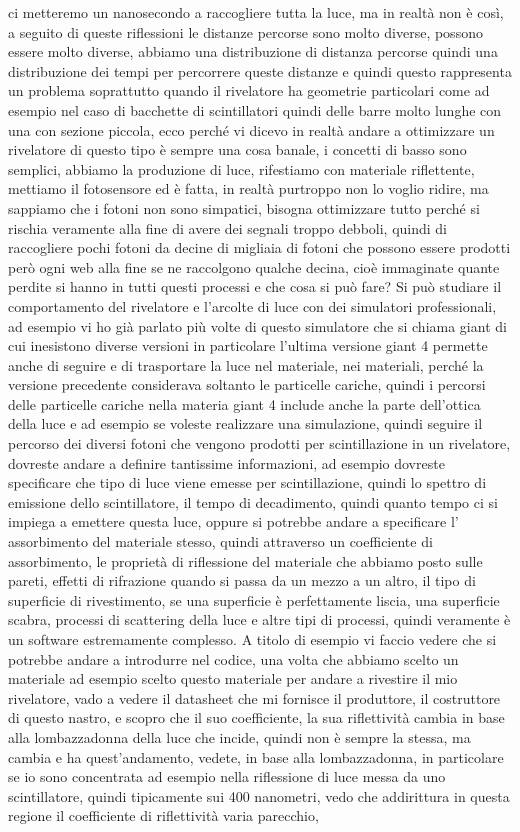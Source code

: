 {ci metteremo un nanosecondo a raccogliere tutta la luce, ma in realtà non è così, a seguito di queste riflessioni le distanze percorse sono molto diverse, possono essere molto diverse, abbiamo una distribuzione di distanza percorse quindi una distribuzione dei tempi per percorrere queste distanze e quindi questo rappresenta un problema soprattutto quando il rivelatore ha geometrie particolari come ad esempio nel caso di bacchette di scintillatori quindi delle barre molto lunghe con una con sezione piccola, ecco perché vi dicevo in realtà andare a ottimizzare un rivelatore di questo tipo è sempre una cosa banale, i concetti di basso sono semplici, abbiamo la produzione di luce, rifestiamo con materiale riflettente, mettiamo il fotosensore ed è fatta, in realtà purtroppo non lo voglio ridire, ma sappiamo che i fotoni non sono simpatici, bisogna ottimizzare tutto perché si rischia veramente alla fine di avere dei segnali troppo debboli, quindi di raccogliere pochi fotoni da decine di migliaia di fotoni che possono essere prodotti però ogni web alla fine se ne raccolgono qualche decina, cioè immaginate quante perdite si hanno in tutti questi processi e che cosa si può fare? Si può studiare il comportamento del rivelatore e l'arcolte di luce con dei simulatori professionali, ad esempio vi ho già parlato più volte di questo simulatore che si chiama giant di cui inesistono diverse versioni in particolare l'ultima versione giant 4 permette anche di seguire e di trasportare la luce nel materiale, nei materiali, perché la versione precedente considerava soltanto le particelle cariche, quindi i percorsi delle particelle cariche nella materia giant 4 include anche la parte dell'ottica della luce e ad esempio se voleste realizzare una simulazione, quindi seguire il percorso dei diversi fotoni che vengono prodotti per scintillazione in un rivelatore, dovreste andare a definire tantissime informazioni, ad esempio dovreste specificare che tipo di luce viene emesse per scintillazione, quindi lo spettro di emissione dello scintillatore, il tempo di decadimento, quindi quanto tempo ci si impiega a emettere questa luce, oppure si potrebbe andare a specificare l' assorbimento del materiale stesso, quindi attraverso un coefficiente di assorbimento, le proprietà di riflessione del materiale che abbiamo posto sulle pareti, effetti di rifrazione quando si passa da un mezzo a un altro, il tipo di superficie di rivestimento, se una superficie è perfettamente liscia, una superficie scabra, processi di scattering della luce e altre tipi di processi, quindi veramente è un software estremamente complesso. A titolo di esempio vi faccio vedere che si potrebbe andare a introdurre nel codice, una volta che abbiamo scelto un materiale ad esempio scelto questo materiale per andare a rivestire il mio rivelatore, vado a vedere il datasheet che mi fornisce il produttore, il costruttore di questo nastro, e scopro che il suo coefficiente, la sua riflettività cambia in base alla lombazzadonna della luce che incide, quindi non è sempre la stessa, ma cambia e ha quest'andamento, vedete, in base alla lombazzadonna, in particolare se io sono concentrata ad esempio nella riflessione di luce messa da uno scintillatore, quindi tipicamente sui 400 nanometri, vedo che addirittura in questa regione il coefficiente di riflettività varia parecchio,

}
